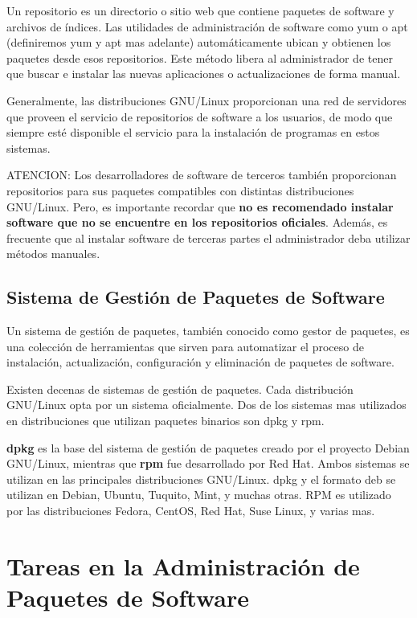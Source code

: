 \documentclass[12pt]{article}
\begin{document}
Un repositorio es un directorio o sitio web que contiene paquetes de software y archivos de índices. 
Las utilidades de administración de software como yum o apt (definiremos yum y apt mas adelante)
automáticamente ubican y obtienen 
los paquetes desde esos repositorios. Este método libera al administrador de tener que buscar e instalar las nuevas aplicaciones o actualizaciones de forma manual. 

Generalmente, las distribuciones GNU/Linux proporcionan una red de servidores que proveen 
el servicio de repositorios de software a los usuarios, de modo que siempre
esté disponible el servicio para la instalación de programas en estos sistemas.

ATENCION: Los desarrolladores de software de terceros también proporcionan repositorios
para sus paquetes compatibles con distintas distribuciones GNU/Linux. Pero,
es importante recordar que {\bf no es recomendado instalar software que no se encuentre en los 
repositorios oficiales}. Además, es frecuente que al instalar software de terceras 
partes el administrador deba utilizar métodos manuales.

\subsection*{Sistema de Gestión de Paquetes de Software}

Un sistema de gestión de paquetes, también conocido como gestor de paquetes, es una colección de herramientas que sirven para automatizar el proceso de instalación, actualización, configuración y eliminación de paquetes de software.

Existen decenas de sistemas de gestión de paquetes. Cada distribución GNU/Linux opta 
por un sistema oficialmente. Dos de los sistemas mas utilizados en distribuciones
que utilizan paquetes binarios son dpkg y rpm.

{\bf dpkg} es la base del sistema de gestión de paquetes creado por el proyecto Debian GNU/Linux, mientras que {\bf rpm}
fue desarrollado por Red Hat.
Ambos sistemas se utilizan en las principales distribuciones GNU/Linux. dpkg y el formato
deb se utilizan en Debian, Ubuntu, Tuquito, Mint, y muchas otras. RPM es utilizado por
las distribuciones Fedora, CentOS, Red Hat, Suse Linux, y varias mas.


\section*{Tareas en la Administración de Paquetes de Software}
\end{document}
